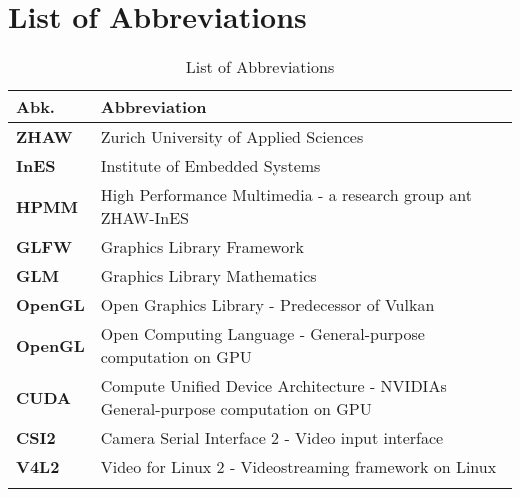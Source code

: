 \chapter*{List of Abbreviations}\label{sec:Glossar}

\begin{longtable}{|m{3cm}|m{11cm}|}	
	\rowcolor{gray} \textbf{Abk.}&
	Abbreviation \\ \hline	
	
	\textbf{ZHAW}&
	Zurich University of Applied Sciences \\ \hline	
	
	\textbf{InES}&
	Institute of Embedded Systems \\ \hline
	
	\textbf{HPMM}&
	High Performance Multimedia - a research group ant ZHAW-InES \\ \hline
	
	\textbf{GLFW}&
	Graphics Library Framework \\ \hline

	\textbf{GLM}&
	Graphics Library Mathematics \\ \hline

	\textbf{OpenGL}&
	Open Graphics Library - Predecessor of Vulkan \\ \hline

	\textbf{OpenGL}&
	Open Computing Language - General-purpose computation on GPU\\ \hline	

	\textbf{CUDA}&
	Compute Unified Device Architecture - NVIDIAs General-purpose computation on GPU\\ \hline	
	
	\textbf{CSI2}&
	Camera Serial Interface 2 - Video input interface\\ \hline

	\textbf{V4L2}&
	Video for Linux 2 - Videostreaming framework on Linux\\ \hline

	\caption{List of Abbreviations}
	\label{tab:glossar}
\end{longtable}%
